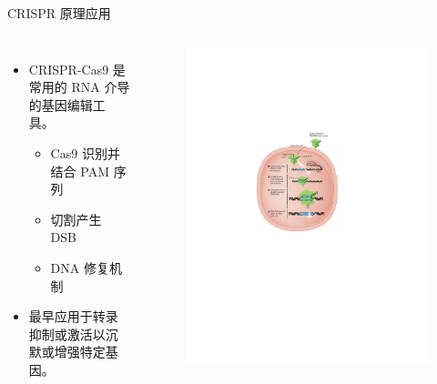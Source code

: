 \documentclass{beamer}
\begin{document}
	\begin{frame}{CRISPR 原理}{应用}
		\begin{columns}
			\begin{itemize}
				\item CRISPR-Cas9 是常用的 RNA 介导的基因编辑工具。
				\begin{itemize}
					\item Cas9 识别并结合 PAM 序列
					\item 切割产生 DSB
					\item DNA 修复机制
				\end{itemize}
				\item 最早应用于转录抑制或激活以沉默或增强特定基因。
			\end{itemize}

			\begin{figure}
				\centering
				\includegraphics[width=\textwidth]{img/util.pdf}
			\end{figure}	
		\end{columns}
	\end{frame}
	
\end{document}

